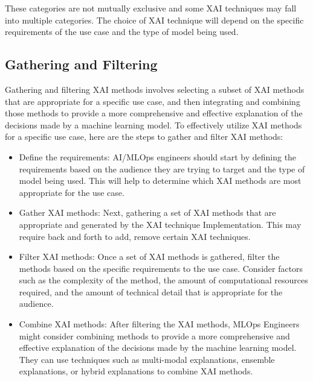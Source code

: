 \documentclass[conference]{IEEEtran}
\begin{document}
These categories are not mutually exclusive and some XAI techniques may fall into multiple categories. The choice of XAI technique will depend on the specific requirements of the use case and the type of model being used.

\subsection{Gathering and Filtering} Gathering and filtering XAI methods involves selecting a subset of XAI methods that are appropriate for a specific use case, and then integrating and combining those methods to provide a more comprehensive and effective explanation of the decisions made by a machine learning model. To effectively utilize XAI methods for a specific use case, here are the steps to gather and filter XAI methods: 
\begin{itemize}
	\item Define the requirements: AI/MLOps engineers should start by defining the requirements based on the audience they are trying to target and the type of model being used. This will help to determine which XAI methods are most appropriate for the use case.
	\item Gather XAI methods: Next, gathering a set of XAI methods that are appropriate and generated by the XAI technique Implementation. This may require back and forth to add, remove certain XAI techniques.
	\item Filter XAI methods: Once a set of XAI methods is gathered, filter the methods based on the specific requirements to the use case. Consider factors such as the complexity of the method, the amount of computational resources required, and the amount of technical detail that is appropriate for the audience.
	\item Combine XAI methods: After filtering the XAI methods, MLOps Engineers might consider combining methods to provide a more comprehensive and effective explanation of the decisions made by the machine learning model. They can use techniques such as multi-modal explanations, ensemble explanations, or hybrid explanations to combine XAI methods.
\end{itemize}
\end{document}
